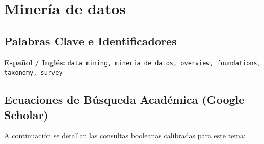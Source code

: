 \section{Minería de datos}
\label{sec:01_mineria_datos}


\subsection{Palabras Clave e Identificadores}
\textbf{Español / Inglés:} \texttt{data mining, minería de datos, overview, foundations, taxonomy, survey}


\subsection{Ecuaciones de Búsqueda Académica (Google Scholar)}
A continuación se detallan las consultas booleanas calibradas para este tema:
